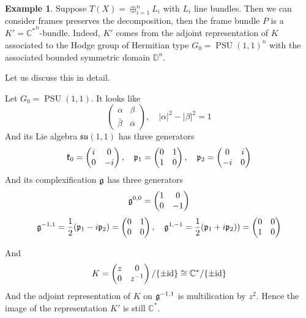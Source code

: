 \documentclass[aspectratio=169, 10pt]{beamer}
\theoremstyle{definition}
\theoremstyle{example}
\newtheorem{Ex}{Example}
\begin{document}
	\begin{frame}
		\begin{Ex}\label{ex1}
			Suppose $T(X)=\oplus_{i=1}^{n}L_i$ with $L_i$ line bundles. Then we can consider frames preserves the decomposition, then the frame bundle $P$ is a $K'={\mathbb{C}^*}^{n}$-bundle. Indeed, $K'$ comes from the adjoint representation of $K$ associated to the Hodge group of Hermitian type $G_0=\operatorname{PSU}(1,1)^n$ with the associated bounded symmetric domain $\mathbb{D}^n$. 
		\end{Ex}
		Let us discuss this in detail.
	\end{frame}
	
	\begin{frame}
		Let $G_0=\operatorname{PSU}(1,1)$. It looks like
			\[ \begin{pmatrix} \alpha & \beta \\ \bar{\beta} & \bar{\alpha} \end{pmatrix}, \quad  |\alpha|^2 - |\beta|^2 = 1 \]
		And its Lie algebra $\mathfrak{su}(1,1)$ has three generators 
		\[
			\mathfrak{k}_0 = \begin{pmatrix} i & 0 \\ 0 & -i \end{pmatrix}, \quad
			\mathfrak{p}_1 = \begin{pmatrix} 0 & 1 \\ 1 & 0 \end{pmatrix}, \quad
			\mathfrak{p}_2 = \begin{pmatrix} 0 & i \\ -i & 0 \end{pmatrix} 
		\]
		And its complexification $\mathfrak{g}$ has three generators
	\[
		\mathfrak{g}^{0,0}=\begin{pmatrix} 1 & 0 \\ 0 & -1 \end{pmatrix}\]
	\[	
		\mathfrak{g}^{-1,1} = \frac{1}{2}(\mathfrak{p}_1 - i \mathfrak{p}_2) = \begin{pmatrix} 0 & 1 \\ 0 & 0 \end{pmatrix},\quad	
		\mathfrak{g}^{1,-1}= \frac{1}{2}(\mathfrak{p}_1 + i \mathfrak{p}_2)) = \begin{pmatrix} 0 & 0 \\ 1 & 0 \end{pmatrix}
	\]
	\end{frame}
	\begin{frame}
		And 
		\[
			K=\begin{pmatrix} z & 0 \\ 0 & z^{-1} \end{pmatrix}/\{\pm \mathrm{id}\}\cong \mathbb{C}^*/\{\pm \mathrm{id}\}
		\]
		And the adjoint representation of $K$ on $\mathfrak{g}^{-1,1}$ is multilication by $z^2$. Hence the image of the representation $K'$ is still $\mathbb{C}^*$.
	\end{frame}
\end{document}
